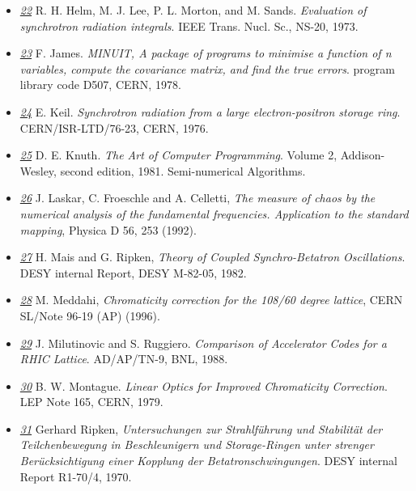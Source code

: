 \begin{itemize}
	\item \href{helm}{\textit{22}} R. H. Helm, M. J. Lee, P. L. Morton, and M. Sands. \textit{Evaluation of synchrotron radiation integrals}. IEEE Trans. Nucl. Sc., NS-20, 1973. 


	\item \href{minuit}{\textit{23}} F. James. \textit{MINUIT, A package of programs to minimise a function of n   variables, compute the covariance matrix, and find the true errors}. program library code D507, CERN, 1978. 


	\item \href{keil}{\textit{24}} E. Keil. \textit{Synchrotron radiation from a large electron-positron storage ring}. CERN/ISR-LTD/76-23, CERN, 1976. 


	\item \href{knuth}{\textit{25}} D. E. Knuth. \textit{The Art of Computer Programming}. Volume 2, Addison-Wesley, second edition, 1981. Semi-numerical Algorithms. 


	\item \href{laskar}{\textit{26}} J. Laskar, C. Froeschle and A. Celletti, \textit{The measure of chaos by the numerical analysis of the fundamental   frequencies. Application to the standard mapping}, Physica D 56, 253 (1992). 


	\item \href{mais}{\textit{27}} H. Mais and G. Ripken, \textit{Theory of Coupled Synchro-Betatron Oscillations}. DESY internal Report, DESY M-82-05, 1982. 


	\item \href{malika}{\textit{28}} M. Meddahi, \textit{Chromaticity correction for the 108/60 degree lattice}, CERN SL/Note 96-19 (AP) (1996). 


	\item \href{ruggiero}{\textit{29}} J. Milutinovic and S. Ruggiero. \textit{Comparison of Accelerator Codes for a RHIC Lattice}. AD/AP/TN-9, BNL, 1988. 


	\item \href{montague}{\textit{30}} B. W. Montague. \textit{Linear Optics for Improved Chromaticity Correction}. LEP Note 165, CERN, 1979. 


	\item \href{ripken}{\textit{31}} Gerhard Ripken, \textit{Untersuchungen zur Strahlf\"uhrung und Stabilit\"at der Teilchenbewegung in Beschleunigern und Storage-Ringen unter strenger Ber\"ucksichtigung einer Kopplung der Betatronschwingungen}. DESY internal Report R1-70/4, 1970. 



\end{itemize}
